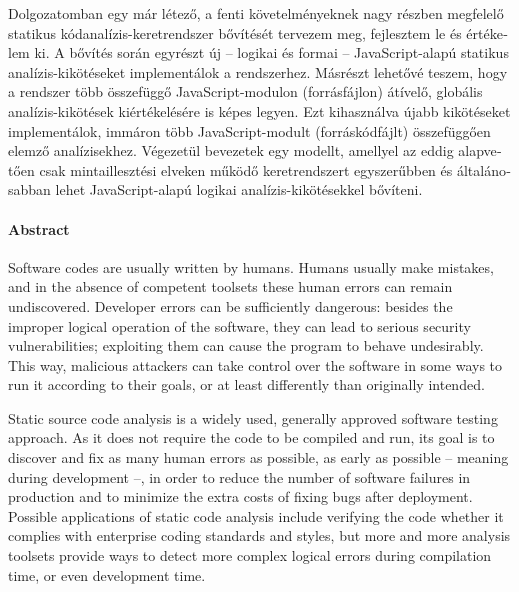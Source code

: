 \begin{otherlanguage}{magyar}
  Dolgozatomban egy már létező, a fenti követelményeknek nagy részben megfelelő statikus kódanalízis-keretrendszer bővítését tervezem meg, fejlesztem le és értékelem ki. A bővítés során egyrészt új – logikai és formai – JavaScript-alapú statikus analízis-kikötéseket implementálok a rendszerhez. Másrészt lehetővé teszem, hogy a rendszer több összefüggő JavaScript-modulon (forrásfájlon) átívelő, globális analízis-kikötések kiértékelésére is képes legyen. Ezt kihasználva újabb kikötéseket implementálok, immáron több JavaScript-modult (forráskódfájlt) összefüggően elemző analízisekhez. Végezetül bevezetek egy modellt, amellyel az eddig alapvetően csak mintaillesztési elveken működő keretrendszert egyszerűbben és általánosabban lehet JavaScript-alapú logikai analízis-kikötésekkel bővíteni.

\end{otherlanguage}

\cleardoublepage

\paragraph*{Abstract}
{}
\thispagestyle{plain}

	Software codes are usually written by humans. Humans usually make mistakes, and in the absence of competent toolsets these human errors can remain undiscovered. Developer errors can be sufficiently dangerous: besides the improper logical operation of the software, they can lead to serious security vulnerabilities; exploiting them can cause the program to behave undesirably. This way, malicious attackers can take control over the software in some ways to run it according to their goals, or at least differently than originally intended.

	Static source code analysis is a widely used, generally approved software testing approach. As it does not require the code to be compiled and run, its goal is to discover and fix as many human errors as possible, as early as possible – meaning during development –, in order to reduce the number of software failures in production and to minimize the extra costs of fixing bugs after deployment. Possible applications of static code analysis include verifying the code whether it complies with enterprise coding standards and styles, but more and more analysis toolsets provide ways to detect more complex logical errors during compilation time, or even development time.

